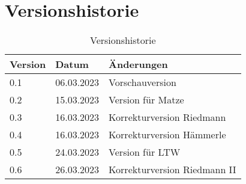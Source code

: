 \section*{Versionshistorie}

\begin{table}[H]
  \centering
  \begin{tabular}{lll}
    \toprule
    \textbf{Version} & \textbf{Datum} & \textbf{Änderungen}          \\
    \midrule
    0.1              & 06.03.2023     & Vorschauversion              \\
    0.2              & 15.03.2023     & Version für Matze            \\
    0.3              & 16.03.2023     & Korrekturversion Riedmann    \\
    0.4              & 16.03.2023     & Korrekturversion Hämmerle    \\
    0.5              & 24.03.2023     & Version für LTW              \\
    0.6              & 26.03.2023     & Korrekturversion Riedmann II \\
    \bottomrule
  \end{tabular}
  \caption{Versionshistorie}
  \label{tab:versionshistorie}
\end{table}